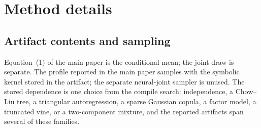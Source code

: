 \documentclass{article}
\title{\texorpdfstring{\raggedright Supplement: D.O.P.E.: Downstream Objective-Preserving Encoding\\\large Generative Compression of Predictive Structure}{Supplement: D.O.P.E.: Downstream Objective-Preserving Encoding -- Generative Compression of Predictive Structure}}
\author{Jepson Taylor$^1$, Alton Alexander$^1$, Jordan Morrow$^1$\\[0.15cm]
$^1$NEVERHUMAN Research}
\begin{document}





\maketitle
\fancyhead{}
\renewcommand{\headrulewidth}{0pt}

\begin{abstract}
\raggedright
This supplement holds the method details, the release-gate specification and its conformance test, the data and selection protocol, the statistics, every five-seed contrast and level behind the main paper, the controls, the fidelity and empirical-privacy panels, the ablations, the baseline coverage, the per-lineage tables, and the extended related work. A blank retention cell is an unavailable fit or an auditor that is uninformative on one of the three sample seeds; it is never a zero. BeyondArena is a separate fit check and is never pooled with the PMLB panel.
\end{abstract}

\raggedbottom
\appendix
\raggedright

\section{Method details}
\label{app:method}
\subsection{Artifact contents and sampling}
\label{app:sampling}
Equation~(1) of the main paper is the conditional mean; the joint draw is separate. The profile reported in the main paper samples with the symbolic kernel stored in the artifact; the separate neural-joint sampler is unused. The stored dependence is one choice from the compile search: independence, a Chow--Liu tree, a triangular autoregression, a sparse Gaussian copula, a factor model, a truncated vine, or a two-component mixture, and the reported artifacts span several of these families.
\end{document}
